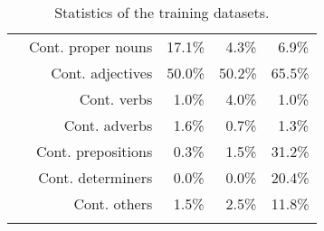 \begin{table}[h]
\begin{tabular}{@{~}r@{~}r@{~}c@{~}c@{~}c@{~}}
        & Cont. proper nouns & 17.1\% & $~~$4.3\% & $~~$6.9\%\\
        & Cont. adjectives & 50.0\% & 50.2\% & 65.5\%\\
        & Cont. verbs & $~~$1.0\% & $~~$4.0\% & $~~$1.0\%\\
        & Cont. adverbs & $~~$1.6\% & $~~$0.7\% & $~~$1.3\%\\
        & Cont. prepositions & $~~$0.3\% & $~~$1.5\% & 31.2\%\\
        & Cont. determiners & $~~$0.0\% & $~~$0.0\% & 20.4\%\\
        & Cont. others & $~~$1.5\% & $~~$2.5\% & 11.8\%\\
        \addlinespace[.5\defaultaddspace]
        \bottomrule
      \end{tabular}
      \caption{Statistics of the training datasets.
               \label{tab:train_dataset_statistics}}
    \end{table}

